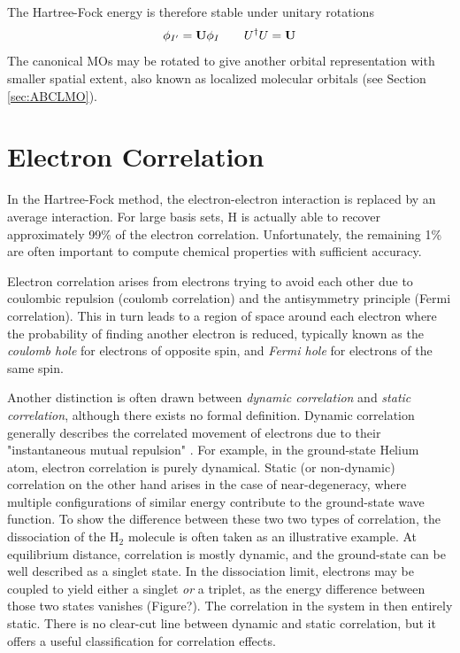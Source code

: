 The Hartree-Fock energy is therefore stable under unitary rotations
\begin{equation}
\phi_{I'} = \mathbf{U} \phi_I \qquad U^{\dagger} U = \mathbf{U}
\end{equation}
\noindent The canonical MOs may be rotated to give another orbital representation with smaller spatial extent, also known as localized molecular orbitals (see Section \ref{sec:ABCLMO}).

\section{Electron Correlation \label{sec:CORRELATION}}

In the Hartree-Fock method, the electron-electron interaction is replaced by an average interaction. For large basis sets, H is actually able to recover approximately 99\% of the electron correlation. Unfortunately, the remaining 1\% are often important to compute chemical properties with sufficient accuracy.

Electron correlation arises from electrons trying to avoid each other due to coulombic repulsion (coulomb correlation) and the antisymmetry principle (Fermi correlation). This in turn leads to a region of space around each electron where the probability of finding another electron is reduced, typically known as the \emph{coulomb hole} for electrons of opposite spin, and \emph{Fermi hole} for electrons of the same spin. 

Another distinction is often drawn between \emph{dynamic correlation} and \emph{static correlation}, although there exists no formal definition. Dynamic correlation generally describes the correlated movement of electrons due to their "instantaneous mutual repulsion" \cite{Jen2017}. For example, in the ground-state Helium atom, electron correlation is purely dynamical. Static (or non-dynamic) correlation on the other hand arises in the case of near-degeneracy, where multiple configurations of similar energy contribute to the ground-state wave function. To show the difference between these two two types of correlation, the dissociation of the H$_2$ molecule is often taken as an illustrative example. At equilibrium distance, correlation is mostly dynamic, and the ground-state can be well described as a singlet state. In the dissociation limit, electrons may be coupled to yield either a singlet \emph{or} a triplet, as the energy difference between those two states vanishes (Figure?). The correlation in the system in then entirely static. There is no clear-cut line between dynamic and static correlation, but it offers a useful classification for correlation effects.

